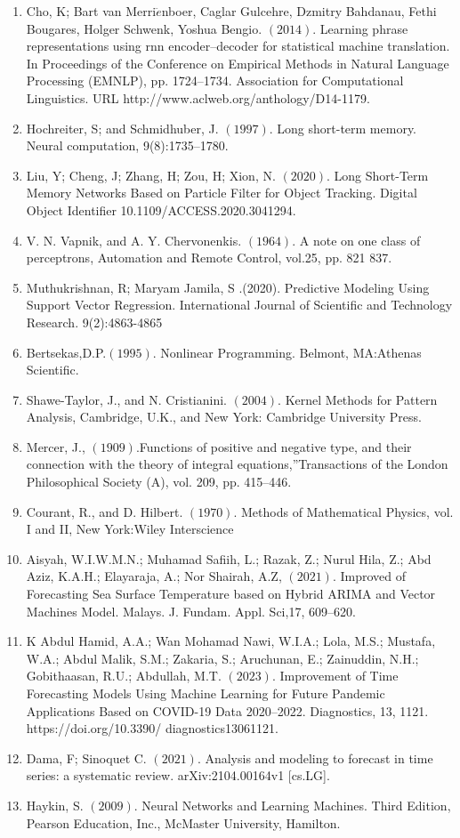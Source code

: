 \documentclass[runningheads]{llncs}
\begin{document}
\begin{enumerate}
  \item Cho, K; Bart van Merri$\ddot{e}$nboer, Caglar Gulcehre,
  Dzmitry Bahdanau, Fethi Bougares, Holger Schwenk, Yoshua Bengio.
  $(2014)$. Learning phrase representations using rnn encoder–decoder
  for statistical machine translation. In Proceedings of the  Conference 
  on Empirical Methods in Natural Language Processing (EMNLP),
  pp. 1724–1734. Association
  for Computational Linguistics.
  URL http://www.aclweb.org/anthology/D14-1179.
  \item Hochreiter, S; and Schmidhuber, J. $(1997)$. 
  Long short-term memory. Neural computation, 9(8):1735–1780.
  \item  Liu, Y;  Cheng, J; Zhang, H;   Zou, H; Xion, N. $(2020)$.
  Long Short-Term Memory Networks Based on Particle Filter for
  Object Tracking. Digital Object Identifier 10.1109/ACCESS.2020.3041294.
  \item V. N. Vapnik, and A. Y. Chervonenkis. $(1964)$. A note on one class of perceptrons, 
  Automation and Remote Control, vol.25, pp. 821 837.
  \item  Muthukrishnan, R; Maryam Jamila, S .(2020).  Predictive Modeling Using Support Vector Regression.
 International Journal of Scientific and Technology Research. 9(2):4863-4865
  \item Bertsekas,D.P.$(1995)$. Nonlinear Programming. Belmont, MA:Athenas Scientific.
  \item Shawe-Taylor, J., and N. Cristianini. $(2004)$. Kernel Methods for Pattern Analysis, Cambridge, U.K.,
  and New York: Cambridge University Press.
  \item Mercer, J., $(1909)$.Functions of positive and negative type, and their connection with the theory of
  integral equations,”Transactions of the London Philosophical Society (A), vol. 209, pp. 415–446.
   \item Courant, R., and D. Hilbert. $(1970)$. Methods of Mathematical Physics, vol. I and II, New York:Wiley
 Interscience
 \item Aisyah, W.I.W.M.N.; Muhamad Safiih, L.; Razak, Z.; Nurul Hila, Z.;
 Abd Aziz, K.A.H.; Elayaraja, A.; Nor Shairah, A.Z, $(2021)$. Improved
of Forecasting Sea Surface Temperature based on Hybrid ARIMA and Vector 
Machines Model. Malays. J. Fundam. Appl. Sci,17, 609–620.
\item K Abdul Hamid, A.A.; Wan Mohamad Nawi, W.I.A.; Lola, M.S.; Mustafa, W.A.; Abdul Malik, S.M.; Zakaria, S.; Aruchunan, E.; Zainuddin, N.H.; Gobithaasan, R.U.;
Abdullah, M.T. $(2023)$. Improvement of Time Forecasting Models Using Machine Learning for Future Pandemic 
Applications Based on COVID-19 Data 2020–2022. Diagnostics, 13, 1121.
 https://doi.org/10.3390/ diagnostics13061121.
\item Dama, F; Sinoquet C. $(2021)$. Analysis and modeling to forecast in time series:
a systematic review. arXiv:2104.00164v1 [cs.LG].
\item Haykin, S. $(2009)$. Neural Networks and Learning Machines. Third Edition, Pearson Education, Inc., McMaster University, Hamilton.
\end{enumerate}
\end{document}
